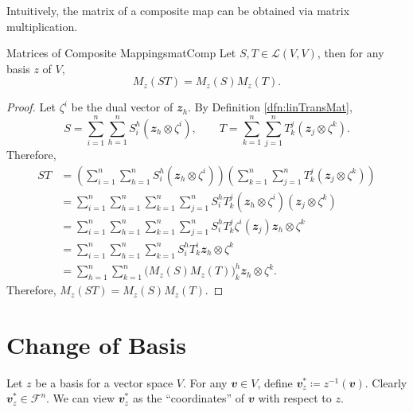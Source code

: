\documentclass[math, code]{amznotes}
\theoremstyle{remark}
\begin{document}
Intuitively, the matrix of a composite map can be obtained via matrix multiplication.
\begin{probox}{Matrices of Composite Mappings}{matComp}
    Let $S, T \in \mathcal{L}(V, V)$, then for any basis $z$ of $V$, 
    \begin{equation*}
        M_z(ST) = M_z(S)M_z(T).
    \end{equation*}
    \tcblower
    \begin{proof}
        Let $\zeta^i$ be the dual vector of $\mathbfit{z}_h$. By Definition \ref{dfn:linTransMat}, 
        \begin{equation*}
            S = \sum_{i = 1}^{n}\sum_{h = 1}^{n}S^h_i(\mathbfit{z}_h \otimes \zeta^i), \qquad T = \sum_{k = 1}^{n}\sum_{j = 1}^{n}T^j_k(\mathbfit{z}_j \otimes \zeta^k).
        \end{equation*}
        Therefore,
        \begin{align*}
            ST & = \left(\sum_{i = 1}^{n}\sum_{h = 1}^{n}S^h_i(\mathbfit{z}_h \otimes \zeta^i)\right)\left(\sum_{k = 1}^{n}\sum_{j = 1}^{n}T^j_k(\mathbfit{z}_j \otimes \zeta^k)\right) \\
            & = \sum_{i = 1}^{n}\sum_{h = 1}^{n}\sum_{k = 1}^{n}\sum_{j = 1}^{n}S^h_iT^j_k(\mathbfit{z}_h \otimes \zeta^i)(\mathbfit{z}_j \otimes \zeta^k) \\
            & = \sum_{i = 1}^{n}\sum_{h = 1}^{n}\sum_{k = 1}^{n}\sum_{j = 1}^{n}S^h_iT^j_k\zeta^i(\mathbfit{z}_j)\mathbfit{z}_h \otimes \zeta^k \\
            & = \sum_{i = 1}^{n}\sum_{h = 1}^{n}\sum_{k = 1}^{n}S^h_iT^i_k\mathbfit{z}_h \otimes \zeta^k \\
            & = \sum_{h = 1}^{n}\sum_{k = 1}^{n}\bigl(M_z(S)M_z(T)\bigr)^h_k\mathbfit{z}_h \otimes \zeta^k.
        \end{align*}
        Therefore, $M_z(ST) = M_z(S)M_z(T)$.
    \end{proof}
\end{probox}
\section{Change of Basis}\label{sectionChangeBasis}
Let $z$ be a basis for a vector space $V$. For any $\mathbfit{v} \in V$, define $\mathbfit{v}^*_z \coloneqq z^{-1}(\mathbfit{v})$. Clearly $\mathbfit{v}^*_z \in \mathcal{F}^n$. We can view $\mathbfit{v}^*_z$ as the ``coordinates'' of $\mathbfit{v}$ with respect to $z$.
\end{document}
